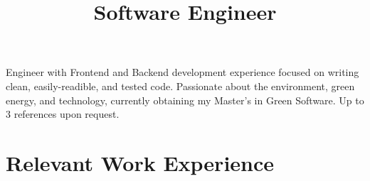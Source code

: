 \documentclass[11pt,a4paper,sans]{moderncv}        %
\title{Software Engineer}                               %
\begin{document}
\makecvtitle

\small{Engineer with Frontend and Backend development experience focused on writing clean, easily-readible, and tested code. Passionate about the environment, green energy, and technology, currently obtaining my Master's in Green Software. Up to 3 references upon request.}

\section{Relevant Work Experience}

\vspace{1pt}
\end{document}

